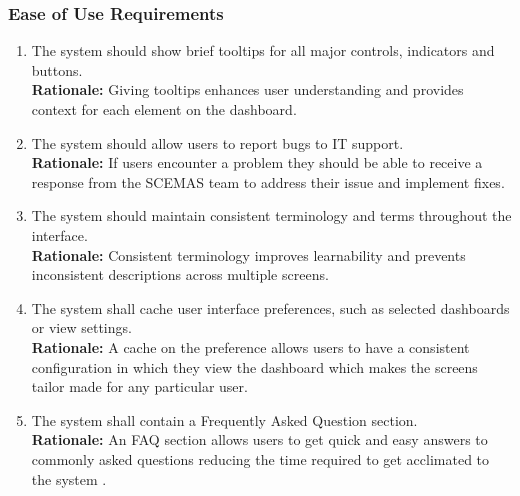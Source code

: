 \documentclass[]{article}
\begin{document}
\subsubsection{Ease of Use Requirements}
\label{ssub:ease_of_use_requirements}
\begin{enumerate}[{UH-EOU}1. ]
	\item The system should show brief tooltips for all major controls, indicators and buttons.\\
	\textbf{Rationale:} Giving tooltips enhances user understanding and provides context for each element on the dashboard.
	\item The system should allow users to report bugs to IT support.\\
	\textbf{Rationale:} If users encounter a problem they should be able to receive a response from the SCEMAS team to address their issue and implement fixes.
	\item The system should maintain consistent terminology and terms throughout the interface.\\
	\textbf{Rationale:} Consistent terminology improves learnability and prevents inconsistent descriptions across multiple screens.
	\item The system shall cache user interface preferences, such as selected dashboards or view settings.\\
	\textbf{Rationale:} A cache on the preference allows users to have a consistent configuration in which they view the dashboard which makes the screens tailor made for any particular user.
	\item The system shall contain a Frequently Asked Question section.\\
	\textbf{Rationale:} An FAQ section allows users to get quick and easy answers to commonly asked questions reducing the time required to get acclimated to the system \cite{murphy2025}.
\end{enumerate}
\end{document}
